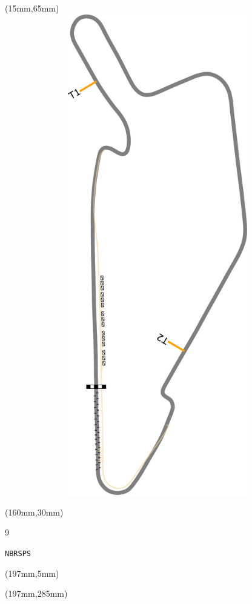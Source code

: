 \begin{textblock*}{185mm}(15mm,65mm)%
\centering
\mbox{\includegraphics[width=185mm,height=210mm,keepaspectratio]{PT/NBRSPS.pdf}}
\end{textblock*}
\begin{textblock*}{40mm}(160mm,30mm)%
\Large
\par{} 
\par9 
\par\hfill\tiny\tt NBRSPS\\
\end{textblock*}
\begin{textblock*}{20mm}(197mm,5mm)%
\fbox{\thepage}
\label{NBRSPS}
\end{textblock*}
\begin{textblock*}{20mm}(197mm,285mm)%
\fbox{\thepage}
\end{textblock*}

